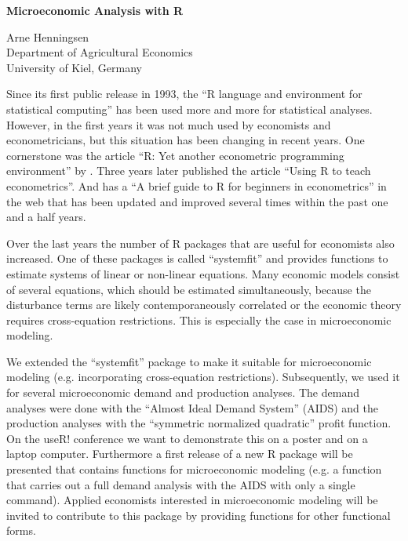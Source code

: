 \documentclass[12pt,english]{article}
\begin{document}
\begin{center}\textbf{\LARGE Microeconomic Analysis with R}\end{center}{\LARGE \par}

\begin{center}Arne Henningsen\\
Department of Agricultural Economics\\
University of Kiel, Germany\end{center}

Since its first public release in 1993, the ``R language and environment
for statistical computing'' \citep{r-project} has been used more
and more for statistical analyses. 
However, in the first years it was not much used by economists and
 econometricians, but this situation has been changing in recent years. 
One cornerstone was the article ``R: Yet another econometric programming
environment'' by \citet{cribari99}.
Three years later \citet{racine02} published the article ``Using R to teach
econometrics''. 
And \citet{arai02} has a ``A brief guide to R for beginners in econometrics''
in the web that has been updated and improved several times within the past 
one and a half years.

Over the last years the number of R packages that are useful for economists
also increased. 
One of these packages is called ``systemfit'' \citep{systemfit} and provides
functions to estimate systems of linear or non-linear equations. 
Many economic models consist of several equations, which should be estimated
simultaneously, because the disturbance terms are likely contemporaneously
correlated or the economic theory requires cross-equation restrictions. 
This is especially the case in microeconomic modeling.

We extended the ``systemfit'' package to make it suitable for microeconomic
modeling (e.g. incorporating cross-equation restrictions).
Subsequently, we used it for several microeconomic demand and production
analyses. 
The demand analyses were done with the ``Almost Ideal Demand System'' (AIDS)
\citep{deaton80a} and the production analyses with the ``symmetric normalized
quadratic'' profit function. 
On the useR! conference we want to demonstrate this on a poster and on
a laptop computer. 
Furthermore a first release of a new R package will be presented that 
contains functions for microeconomic modeling (e.g. a function that carries 
out a full demand analysis with the AIDS with only a single command). 
Applied economists interested in microeconomic modeling will be invited to
contribute to this package by providing functions for other functional forms.


%

\end{document}
